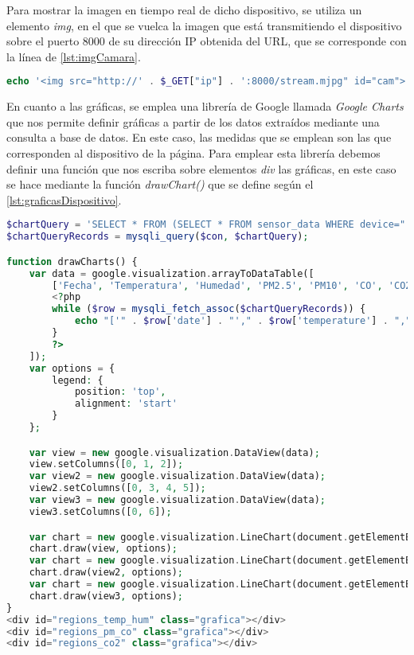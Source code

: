 Para mostrar la imagen en tiempo real de dicho dispositivo, se utiliza un elemento \textit{img}, en el que se vuelca la imagen que está transmitiendo el dispositivo sobre el puerto 8000 de su dirección IP obtenida del URL, que se corresponde con la línea de \autoref{lst:imgCamara}.
\begin{lstlisting}[language=PHP, caption=Cuadro de imagen de la cámara, label=lst:imgCamara]
echo '<img src="http://' . $_GET["ip"] . ':8000/stream.mjpg" id="cam">'
\end{lstlisting}

En cuanto a las gráficas, se emplea una librería de Google llamada \textit{Google Charts} que nos permite definir gráficas a partir de los datos extraídos mediante una consulta a base de datos. En este caso, las medidas que se emplean son las que corresponden al dispositivo de la página. Para emplear esta librería debemos definir una función que nos escriba sobre elementos \textit{div} las gráficas, en este caso se hace mediante la función \textit{drawChart()} que se define según el \autoref{lst:graficasDispositivo}.
\begin{lstlisting}[language=PHP, caption=Graficas de las medidas del dispositivo, label=lst:graficasDispositivo]
$chartQuery = 'SELECT * FROM (SELECT * FROM sensor_data WHERE device="' . $_GET["id"] . '" ORDER BY date DESC LIMIT 720) sub ORDER BY date ASC';
$chartQueryRecords = mysqli_query($con, $chartQuery);

function drawCharts() {
    var data = google.visualization.arrayToDataTable([
        ['Fecha', 'Temperatura', 'Humedad', 'PM2.5', 'PM10', 'CO', 'CO2'],
        <?php
        while ($row = mysqli_fetch_assoc($chartQueryRecords)) {
            echo "['" . $row['date'] . "'," . $row['temperature'] . "," . $row['humidity'] . "," . $row['pm2_5'] . "," . $row['pm10'] . "," . $row['co'] . "," . $row['co2'] . "],";
        }
        ?>
    ]);
    var options = {
        legend: {
            position: 'top',
            alignment: 'start'
        }
    };

    var view = new google.visualization.DataView(data);
    view.setColumns([0, 1, 2]);
    var view2 = new google.visualization.DataView(data);
    view2.setColumns([0, 3, 4, 5]);
    var view3 = new google.visualization.DataView(data);
    view3.setColumns([0, 6]);

    var chart = new google.visualization.LineChart(document.getElementById('regions_temp_hum'));
    chart.draw(view, options);
    var chart = new google.visualization.LineChart(document.getElementById('regions_pm_co'));
    chart.draw(view2, options);
    var chart = new google.visualization.LineChart(document.getElementById('regions_co2'));
    chart.draw(view3, options);
}
<div id="regions_temp_hum" class="grafica"></div>
<div id="regions_pm_co" class="grafica"></div>
<div id="regions_co2" class="grafica"></div>
\end{lstlisting}

